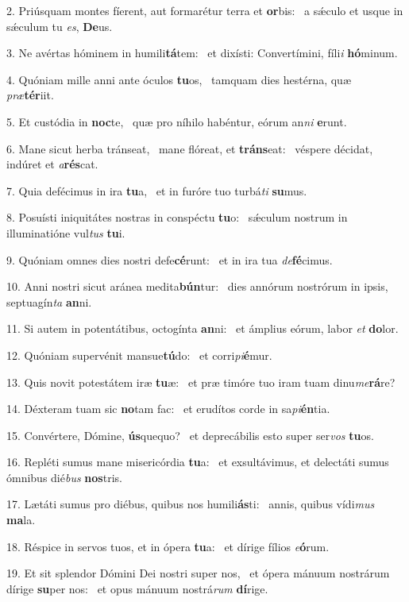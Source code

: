 2. Priúsquam montes fíerent, aut formarétur terra et \textbf{or}bis: \ast\  a sǽculo et usque in sǽculum tu \textit{es}, \textbf{De}us.\

3. Ne avértas hóminem in humili\textbf{tá}tem: \ast\  et dixísti: Convertímini, fíli\textit{i} \textbf{hó}minum.\

4. Quóniam mille anni ante óculos \textbf{tu}os, \ast\  tamquam dies hestérna, quæ \textit{præ}\textbf{tér}iit.\

5. Et custódia in \textbf{noc}te, \ast\  quæ pro níhilo habéntur, eórum an\textit{ni} \textbf{e}runt.\

6. Mane sicut herba tránseat, \dag\  mane flóreat, et \textbf{tráns}eat: \ast\  véspere décidat, indúret et \textit{a}\textbf{rés}cat.\

7. Quia defécimus in ira \textbf{tu}a, \ast\  et in furóre tuo turbá\textit{ti} \textbf{su}mus.\

8. Posuísti iniquitátes nostras in conspéctu \textbf{tu}o: \ast\  sǽculum nostrum in illuminatióne vul\textit{tus} \textbf{tu}i.\

9. Quóniam omnes dies nostri defe\textbf{cé}runt: \ast\  et in ira tua \textit{de}\textbf{fé}cimus.\

10. Anni nostri sicut aránea medita\textbf{bún}tur: \ast\  dies annórum nostrórum in ipsis, septuagín\textit{ta} \textbf{an}ni.\

11. Si autem in potentátibus, octogínta \textbf{an}ni: \ast\  et ámplius eórum, labor \textit{et} \textbf{do}lor.\

12. Quóniam supervénit mansue\textbf{tú}do: \ast\  et corri\textit{pi}\textbf{é}mur.\

13. Quis novit potestátem iræ \textbf{tu}æ: \ast\  et præ timóre tuo iram tuam dinu\textit{me}\textbf{rá}re?\

14. Déxteram tuam sic \textbf{no}tam fac: \ast\  et erudítos corde in sa\textit{pi}\textbf{én}tia.\

15. Convértere, Dómine, \textbf{ús}quequo? \ast\  et deprecábilis esto super ser\textit{vos} \textbf{tu}os.\

16. Repléti sumus mane misericórdia \textbf{tu}a: \ast\  et exsultávimus, et delectáti sumus ómnibus dié\textit{bus} \textbf{nos}tris.\

17. Lætáti sumus pro diébus, quibus nos humili\textbf{ás}ti: \ast\  annis, quibus vídi\textit{mus} \textbf{ma}la.\

18. Réspice in servos tuos, et in ópera \textbf{tu}a: \ast\  et dírige fílios \textit{e}\textbf{ó}rum.\

19. Et sit splendor Dómini Dei nostri super nos, \dag\  et ópera mánuum nostrárum dírige \textbf{su}per nos: \ast\  et opus mánuum nostrá\textit{rum} \textbf{dí}rige.\

